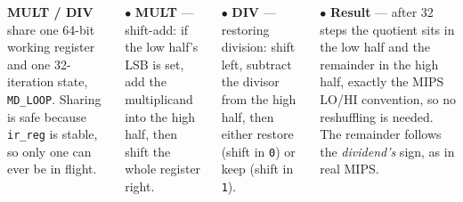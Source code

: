 \documentclass[
  25pt,
  margin=0.8in,
  innermargin=0.6in,
  colspace=0.8in,
  blockverticalspace=0.32in
]{tikzposter}
\begin{document}
\begin{columns}
{  \vspace{0.7em}
  \textbf{MULT / DIV} share one 64-bit working register and one
  32-iteration state, \texttt{MD\_LOOP}. Sharing is safe because
  \texttt{ir\_reg} is stable, so only one can ever be in flight.

  \vspace{0.3em}
  $\bullet$ \textbf{MULT} --- shift-add: if the low half's LSB is set, add
  the multiplicand into the high half, then shift the whole register
  right.\par
  $\bullet$ \textbf{DIV} --- restoring division: shift left, subtract the
  divisor from the high half, then either restore (shift in \texttt{0}) or
  keep (shift in \texttt{1}).\par
  $\bullet$ \textbf{Result} --- after 32 steps the quotient sits in the
  low half and the remainder in the high half, exactly the MIPS LO/HI
  convention, so no reshuffling is needed. The remainder follows the
  \emph{dividend's} sign, as in real MIPS.
}
\end{columns}
\end{document}
